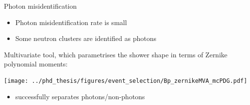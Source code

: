 \documentclass[xcolor=dvipsnames]{beamer}
\begin{document}
\begin{frame}{Photon misidentification}
\centering   \scriptsize


\begin{itemize}
   \item Photon misidentification rate is small
   \item Some neutron clusters are identified as photons
\end{itemize}

\vspace{5pt}

Multivariate tool, which parametrises the shower shape in terms of Zernike polynomial moments:

\vspace{5pt}

\texttt{[image: ../phd\_thesis/figures/event\_selection/Bp\_zernikeMVA\_mcPDG.pdf]}

\begin{itemize}
   \item[\ra] successfully separates photons/non-photons
\end{itemize}

\end{frame}
\end{document}
